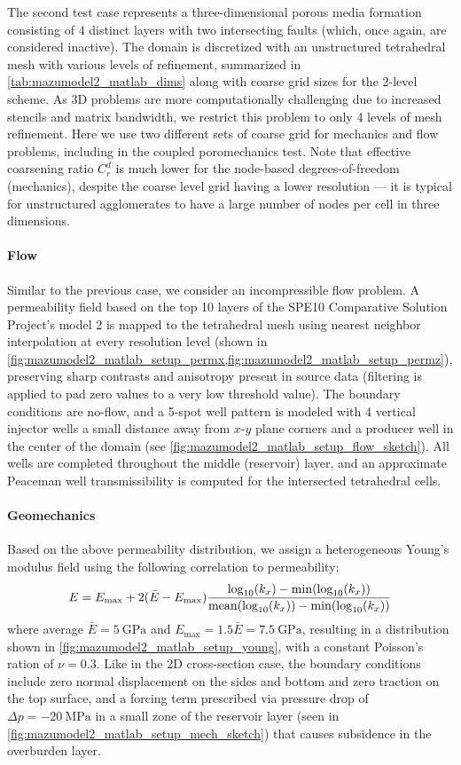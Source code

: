 The second test case represents a three-dimensional porous media formation consisting of 4 distinct layers with two intersecting faults (which, once again, are considered inactive).   The domain is discretized with an unstructured tetrahedral mesh with various levels of refinement, summarized in \cref{tab:mazumodel2_matlab_dims} along with coarse grid sizes for the 2-level scheme.   As 3D problems are more computationally challenging due to increased stencils and matrix bandwidth, we restrict this problem to only 4 levels of mesh refinement.    Here we use two different sets of coarse grid for mechanics and flow problems, including in the coupled poromechanics test.   Note that effective coarsening ratio $C_r^d$ is much lower for the node-based degrees-of-freedom (mechanics), despite the coarse level grid having a lower resolution --- it is typical for unstructured agglomerates to have a large number of nodes per cell in three dimensions.

\paragraph{Flow}
Similar to the previous case, we consider an incompressible flow problem.   A permeability field based on the top 10 layers of the SPE10 Comparative Solution Project's model 2 \cite{Christie2001} is mapped to the tetrahedral mesh using nearest neighbor interpolation at every resolution level (shown in \cref{fig:mazumodel2_matlab_setup_permx,fig:mazumodel2_matlab_setup_permz}), preserving sharp contrasts and anisotropy present in source data (filtering is applied to pad zero values to a very low threshold value).   The boundary conditions are no-flow, and a 5-spot well pattern is modeled with 4 vertical injector wells a small distance away from $x$-$y$ plane corners and a producer well in the center of the domain (see \cref{fig:mazumodel2_matlab_setup_flow_sketch}).   All wells are completed throughout the middle (reservoir) layer, and an approximate Peaceman well transmissibility is computed for the intersected tetrahedral cells.

\paragraph{Geomechanics}
Based on the above permeability distribution, we assign a heterogeneous Young's modulus field using the following correlation to permeability:
\begin{align}
    E = E_{\max} + 2(\bar{E} - E_{\max})\frac{\log_{10}(k_x) - \min(\log_{10}(k_x))}{\operatorname{mean}(\log_{10}(k_x)) - \min(\log_{10}(k_x))}
    \label{eq:young_perm_correlation}
\end{align}
where average $\bar{E} = \qty{5}{\GPa}$ and $E_{\max} = 1.5 \bar{E} = \qty{7.5}{\GPa}$, resulting in a distribution shown in \cref{fig:mazumodel2_matlab_setup_young}, with a constant Poisson's ration of $\nu = 0.3$.   Like in the 2D cross-section case, the boundary conditions include zero normal displacement on the sides and bottom and zero traction on the top surface, and a forcing term prescribed via pressure drop of $\Delta p = \qty{-20}{\MPa}$ in a small zone of the reservoir layer (seen in \cref{fig:mazumodel2_matlab_setup_mech_sketch}) that causes subsidence in the overburden layer.

